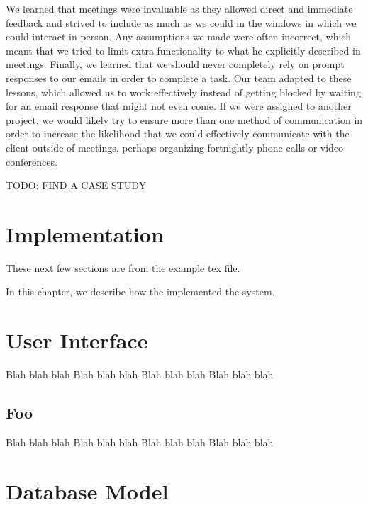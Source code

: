\documentclass{l3proj}
\begin{document}
We learned that meetings were invaluable as they allowed direct and immediate feedback and strived to include as much as we could in the windows in which we could interact in person. Any assumptions we made were often incorrect, which meant that we tried to limit extra functionality to what he explicitly described in meetings. Finally, we learned that we should never completely rely on prompt responses to our emails in order to complete a task. Our team adapted to these lessons, which allowed us to work effectively instead of getting blocked by waiting for an email response that might not even come. If we were assigned to another project, we would likely try to ensure more than one method of communication in order to increase the likelihood that we could effectively communicate with the client outside of meetings, perhaps organizing fortnightly phone calls or video conferences.

TODO: FIND A CASE STUDY

\section{Implementation}
\label{impl}

These next few sections are from the example tex file.

In this chapter, we describe how the implemented the system.

\section{User Interface}

Blah blah blah
Blah blah blah
Blah blah blah
Blah blah blah

\subsection{Foo}

Blah blah blah
Blah blah blah
Blah blah blah
Blah blah blah

\section{Database Model}
\end{document}
